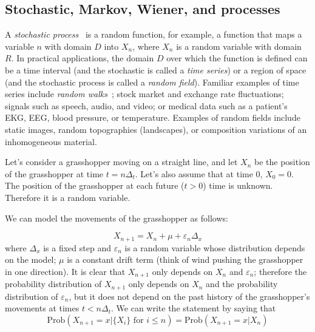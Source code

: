 \documentclass[justified,sixbynine]{tufte-book}
\theoremstyle{plain}%
\theoremstyle{definition}
\theoremstyle{remark}
\begin{document}
\begin{fullwidth}
\goodbreak\section{Stochastic, Markov, Wiener, and processes}


A {\it stochastic process}~\cite{stochastic} is a random function,
for example, a function that maps a
variable $n$ with domain $D$ into $X_n$, where $X_n$ is a random variable
with domain $R$. In practical applications, the domain $D$ over which the
function is defined can be a time interval (and the stochastic is called a
{\it time series}) or a region of space (and the stochastic process is
called a {\it random field}). Familiar examples of time series include {\it %
random walks}~\cite{rwalk}; stock market and exchange rate fluctuations; signals such as
speech, audio, and video; or medical data such as a patient's EKG, EEG, blood
pressure, or temperature. Examples of random fields include static images,
random topographies (landscapes), or composition variations of an
inhomogeneous material.

Let's consider a grasshopper moving on a straight line, and let $X_n$ be the
position of the grasshopper at time $t=n\Delta _t$. Let's also assume that at time 0,
$X_0=0$. The position of the grasshopper at each future ($t>0$) time is unknown.
Therefore it is a random variable.

We can model the movements of the grasshopper as follows:

\begin{equation}
X_{n+1}=X_n + \mu + \varepsilon _n\Delta _x  \label{markov1}
\end{equation}
where $\Delta _x$ is a fixed step and $\varepsilon _n$ is a random variable
whose distribution depends on the model; $\mu$ is a constant drift term
(think of wind pushing the grasshopper in one direction).
It is clear that $X_{n+1}$ only
depends on $X_n$ and $\varepsilon _n$; therefore the probability distribution
of $X_{n+1}$ only depends on $X_n$ and the probability distribution of $%
\varepsilon _n$, but it does not depend on the past history of the grasshopper's movements at
times $t<n\Delta _t$. We can write the statement by saying that
\begin{equation}
\textrm{Prob}(X_{n+1}=x|\{X_i\}\text{ for }i\leq n)=\textrm{Prob}(X_{n+1}=x|X_n)  \label{markov2}
\end{equation}


\end{fullwidth}
\end{document}
